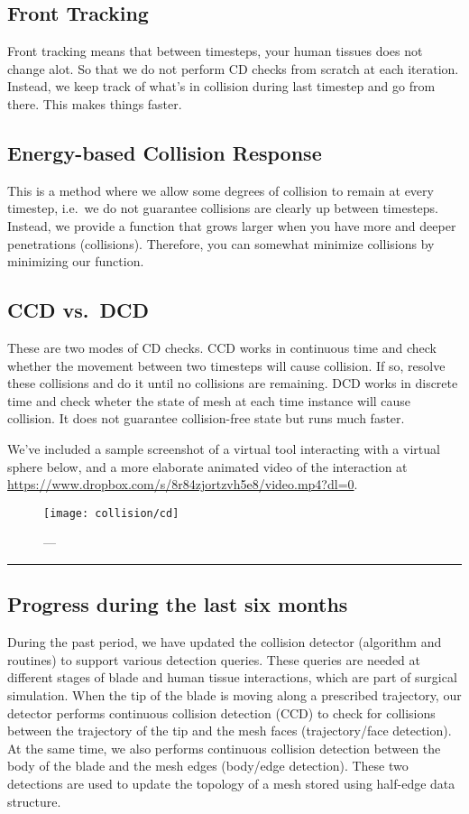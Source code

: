 \subsection{Front Tracking}\label{ssec:front_tracking}
Front tracking means that between timesteps, your human tissues does not change alot. So that we do not perform CD checks from scratch at each iteration. Instead, we keep track of what's in collision during last timestep and go from there. This makes things faster.

\subsection{Energy-based Collision Response}\label{ssec:energy_based_response}
This is a method where we allow some degrees of collision to remain at every timestep, i.e.\ we do not guarantee collisions are clearly up between timesteps. Instead, we provide a function that grows larger when you have more and deeper penetrations (collisions). Therefore, you can somewhat minimize collisions by minimizing our function.

\subsection{CCD vs.\ DCD}\label{ssec:ccd_vs_dcd}
These are two modes of CD checks. CCD works in continuous time and check whether the movement between two timesteps will cause collision. If so, resolve these collisions and do it until no collisions are remaining. DCD works in discrete time and check wheter the state of mesh at each time instance will cause collision. It does not guarantee collision-free state but runs much faster.

We've included a sample screenshot of a virtual tool interacting with a virtual sphere below, and a more elaborate animated video of the interaction at \url{https://www.dropbox.com/s/8r84zjortzvh5e8/video.mp4?dl=0}.

\begin{figure}
  \centering%
	\texttt{[image: collision/cd]}
	\caption{---}\label{fig:cd}
\end{figure}

\hrule%

\subsection{Progress during the last six months}
During the past period, we have updated the collision detector (algorithm and routines) to support various detection queries. These queries are needed at different stages of blade and human tissue interactions, which are part of surgical simulation. When the tip of the blade is moving along a prescribed trajectory, our detector performs continuous collision detection (CCD) to check for collisions between the trajectory of the tip and the mesh faces (trajectory/face detection). At the same time, we also performs continuous collision detection between the body of the blade and the mesh edges (body/edge detection). These two detections are used to update the topology of a mesh stored using half-edge data structure.


